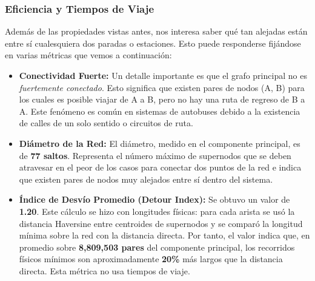         \subsubsection{Eficiencia y Tiempos de Viaje}
            Además de las propiedades vistas antes, nos interesa saber qué tan alejadas están entre sí cualesquiera dos paradas o estaciones. Esto puede responderse fijándose en varias métricas que vemos a continuación:
            \begin{itemize}
                \item \textbf{Conectividad Fuerte:} Un detalle importante es que el grafo principal no es \textit{fuertemente conectado}. Esto significa que existen pares de nodos (A, B) para los cuales es posible viajar de A a B, pero no hay una ruta de regreso de B a A. Este fenómeno es común en sistemas de autobuses debido a la existencia de calles de un solo sentido o circuitos de ruta.
                \item \textbf{Diámetro de la Red:} El diámetro, medido en el componente principal, es de \textbf{77 saltos}. Representa el número máximo de supernodos que se deben atravesar en el peor de los casos para conectar dos puntos de la red e indica que existen pares de nodos muy alejados entre sí dentro del sistema.
                \item \textbf{Índice de Desvío Promedio (Detour Index):} Se obtuvo un valor de \textbf{1.20}. Este cálculo se hizo con longitudes físicas: para cada arista se usó la distancia Haversine entre centroides de supernodos y se comparó la longitud mínima sobre la red con la distancia directa. Por tanto, el valor indica que, en promedio sobre \textbf{8,809,503 pares} del componente principal, los recorridos físicos mínimos son aproximadamente \textbf{20\%} más largos que la distancia directa. Esta métrica no usa tiempos de viaje.
            \end{itemize}

